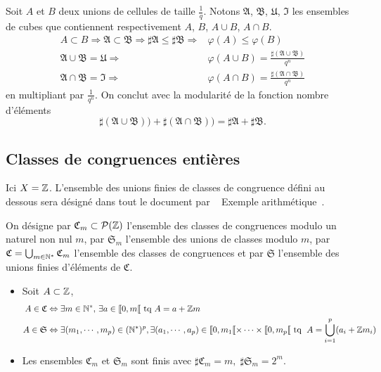 \begin{demo}
 Soit $A$ et $B$ deux unions de cellules de taille $\frac{1}{q}$. Notons $\mathfrak{A}$, $\mathfrak{B}$, $\mathfrak{U}$, $\mathfrak{I}$ les ensembles de cubes que contiennent respectivement $A$, $B$, $A\cup B$, $A\cap B$.
 \begin{align*}
  A \subset B \Rightarrow \mathfrak{A} \subset \mathfrak{B} \Rightarrow \sharp\mathfrak{A} \leq \sharp \mathfrak{B} \Rightarrow& \varphi(A) \leq \varphi(B) \\
  \mathfrak{A}\cup \mathfrak{B} = \mathfrak{U} \Rightarrow& \varphi(A\cup B) = \frac{\sharp(\mathfrak{A}\cup \mathfrak{B})}{q^n} \\
  \mathfrak{A}\cap \mathfrak{B} = \mathfrak{I} \Rightarrow& \varphi(A\cap B) = \frac{\sharp(\mathfrak{A}\cap \mathfrak{B})}{q^n}
 \end{align*}
 en multipliant par $\frac{1}{q^n}$. On conclut avec la modularité de la fonction nombre d'éléments
 \begin{displaymath}
  \sharp(\mathfrak{A}\cup \mathfrak{B})) + \sharp(\mathfrak{A}\cap \mathfrak{B})) = \sharp\mathfrak{A} + \sharp \mathfrak{B}.
 \end{displaymath}
\end{demo}

\subsection{Classes de congruences entières}\label{SubSec:ClassesCongru}
Ici $X = \mathbb{Z}$. 
L'ensemble des unions finies de classes de congruence défini au dessous sera désigné dans tout le document par \og~ Exemple arithmétique~\fg{}.

\begin{defi}
On désigne par $\mathfrak{C}_m \subset \mathcal{P}(\mathbb{Z})$ l'ensemble des classes de congruences modulo un naturel non nul $m$, par $\mathfrak{S}_m$ l'ensemble des unions de classes modulo $m$, par $\mathfrak{C} = \bigcup_{m \in \mathbb{N}^*}\mathfrak{C}_m$ l'ensemble des classes de congruences et par $\mathfrak{S}$ l'ensemble des unions finies d'éléments de $\mathfrak{C}$.
\end{defi}
\begin{rems}
 \begin{itemize}
  \item Soit $A \subset \mathbb{Z}$,
  \begin{align*}
 A \in \mathfrak{C}  &\Leftrightarrow \exists m\in \mathbb{N}^*,\, \exists a \in \llbracket 0, m \llbracket \text{ tq } A = a + \mathbb{Z} m \\
 A\in \mathfrak{S} &\Leftrightarrow \exists (m_1,\cdots,m_p) \in (\mathbb{N}^*)^p, \exists (a_1,\cdots,a_p)\in \llbracket 0,m_1\llbracket \times \dots \times \llbracket 0,m_p\llbracket \text{ tq }\;
 A = \bigcup_{i=1}^{p}(a_i + \mathbb{Z} m_i)
  \end{align*}
    \item Les ensembles $\mathfrak{C}_m$ et $\mathfrak{S}_m$ sont finis avec $\sharp \mathfrak{C}_m = m, \; \sharp \mathfrak{S}_m = 2^m$.
  \end{itemize}
\end{rems}

